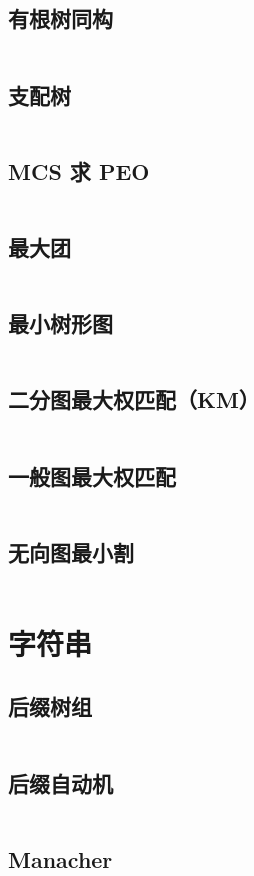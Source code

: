 \documentclass[a4paper,9]{article}
\begin{document}
\subsection{有根树同构}
\inputminted[breaklines]{c++}{graph/rooted_tree_isom.cpp}
\subsection{支配树}
\inputminted[breaklines,breakanywhere]{c++}{graph/dominator.cpp}
\subsection{MCS 求 PEO}
\inputminted[breaklines]{c++}{graph/MCS.cpp}
\subsection{最大团}
\inputminted[breaklines]{c++}{graph/maximum-clique.cpp}
\subsection{最小树形图}
\inputminted[breaklines]{c++}{graph/dmst.cpp}
\subsection{二分图最大权匹配（KM）}
\inputminted[breaklines]{c++}{graph/KM.cpp}
\subsection{一般图最大权匹配}
\inputminted[breaklines,breakanywhere]{c++}{graph/blossom.cpp}
\subsection{无向图最小割}
\inputminted[breaklines,breakanywhere]{c++}{graph/mincut.cpp}

\section{字符串}
\subsection{后缀树组}
\inputminted[breaklines]{c++}{string/sa.cpp}
\subsection{后缀自动机}
\inputminted[breaklines]{c++}{string/sam.cpp}
\subsection{Manacher}
\inputminted[breaklines]{c++}{string/manacher.cpp}
\end{document}
